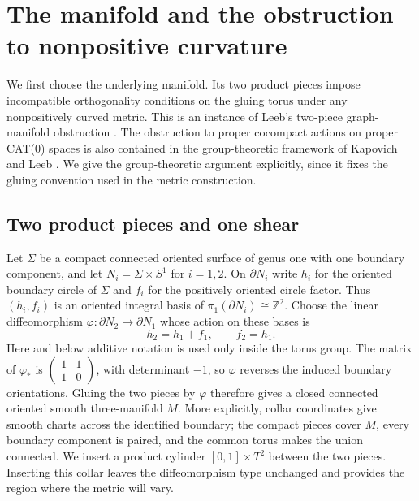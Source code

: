 \section{The manifold and the obstruction to nonpositive curvature}
\label{sec:topology}

We first choose the underlying manifold.  Its two product pieces impose
incompatible orthogonality conditions on the gluing torus under any
nonpositively curved metric.  This is an instance of Leeb's two-piece graph-manifold
obstruction \cite[Section~4.1, Example~4.1]{Leeb1995}.  The obstruction to
proper cocompact actions on proper CAT(0) spaces is also contained in the
group-theoretic framework of Kapovich and Leeb
\cite[Theorem~2.4]{KapovichLeeb1996}.  We give the group-theoretic argument
explicitly, since it fixes the gluing convention used in the metric construction.

\subsection{Two product pieces and one shear}

Let $\Sigma$ be a compact connected oriented surface of genus one with one
boundary component, and let $N_i=\Sigma\times S^1$ for $i=1,2$.
On $\partial N_i$ write $h_i$ for the oriented boundary circle of $\Sigma$
and $f_i$ for the positively oriented circle factor.  Thus $(h_i,f_i)$ is
an oriented integral basis of $\pi_1(\partial N_i)\cong\mathbb Z^2$.
Choose the linear diffeomorphism $\varphi:\partial N_2\longrightarrow
\partial N_1$ whose action on these bases is
\begin{equation}\label{eq:torus-gluing}
 h_2=h_1+f_1,\qquad f_2=h_1.
\end{equation}
Here and below additive notation is used only inside the torus group.
The matrix of $\varphi_*$ is
$\left(\begin{smallmatrix}1&1\\1&0\end{smallmatrix}\right)$, with determinant
$-1$, so $\varphi$ reverses the induced boundary orientations.
Gluing the two pieces by $\varphi$ therefore gives a closed connected
oriented smooth three-manifold $M$.  More explicitly, collar coordinates
give smooth charts across the identified boundary; the compact pieces
cover $M$, every boundary component is paired, and the common torus makes
the union connected.  We insert a product cylinder $[0,1]\times T^2$
between the two pieces.  Inserting this collar leaves the diffeomorphism
type unchanged and provides the region where the metric will vary.

